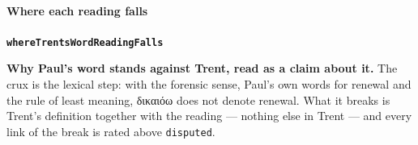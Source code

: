 \documentclass[11pt]{article}
\begin{document}
\paragraph*{Where each reading falls}
\leavevmode\par
\par\medskip\noindent\textbf{\texttt{where\allowbreak{}Trents\allowbreak{}Word\allowbreak{}Reading\allowbreak{}Falls}}\par\nobreak\noindent
\textbf{Why Paul's word stands against Trent, read as a claim about it.} The crux is the lexical step: with the forensic sense, Paul's own words for renewal and the rule of least meaning, δικαιόω does not denote renewal. What it breaks is Trent's definition together with the reading — nothing else in Trent — and every link of the break is rated above \texttt{disputed}.
\end{document}
